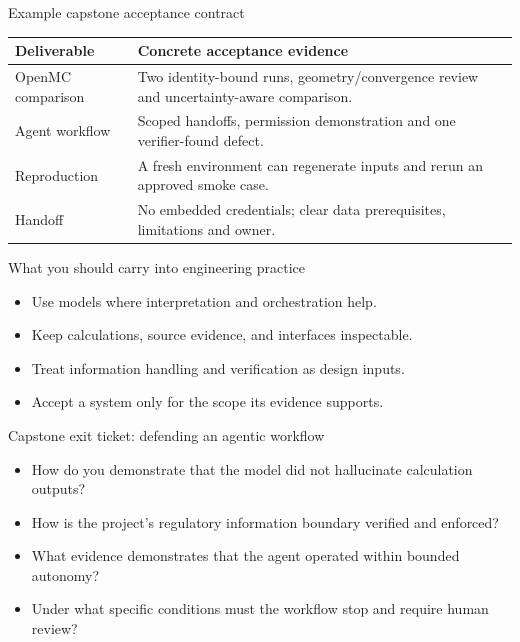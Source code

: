 \documentclass[aspectratio=169,11pt]{beamer}
\begin{document}
\begin{frame}[t,fragile]{Example capstone acceptance contract}
\fontsize{10.5}{12.5}\selectfont\setlength{\tabcolsep}{4pt}\renewcommand{\arraystretch}{1.15}
\begin{tabular}{>{\raggedright\arraybackslash}p{}>{\raggedright\arraybackslash}p{}}
\toprule
\textbf{Deliverable} & \textbf{Concrete acceptance evidence} \\ \midrule
OpenMC comparison & Two identity-bound runs, geometry/convergence review and uncertainty-aware comparison. \\[2pt]
Agent workflow & Scoped handoffs, permission demonstration and one verifier-found defect. \\[2pt]
Reproduction & A fresh environment can regenerate inputs and rerun an approved smoke case. \\[2pt]
Handoff & No embedded credentials; clear data prerequisites, limitations and owner. \\[2pt]
\bottomrule\end{tabular}\par\vspace{2mm}
\end{frame}
\begin{frame}[t,fragile]{What you should carry into engineering practice}
\fontsize{11.5}{14}\selectfont
\begin{itemize}\setlength{\itemsep}{2mm}
\item Use models where interpretation and orchestration help.
\item Keep calculations, source evidence, and interfaces inspectable.
\item Treat information handling and verification as design inputs.
\item Accept a system only for the scope its evidence supports.
\end{itemize}
\end{frame}
\begin{frame}[t,fragile]{Capstone exit ticket: defending an agentic workflow}
\fontsize{11.5}{14}\selectfont
\begin{itemize}\setlength{\itemsep}{2mm}
\item How do you demonstrate that the model did not hallucinate calculation outputs?
\item How is the project's regulatory information boundary verified and enforced?
\item What evidence demonstrates that the agent operated within bounded autonomy?
\item Under what specific conditions must the workflow stop and require human review?
\end{itemize}
\end{frame}
\end{document}
